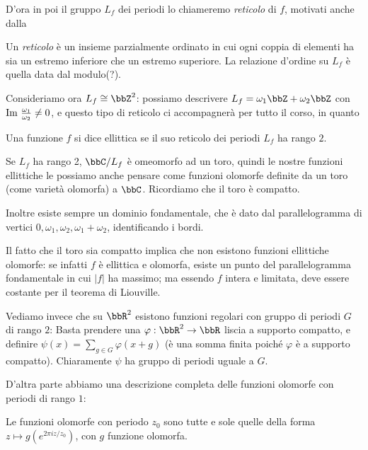 D'ora in poi il gruppo $L_f$ dei periodi lo chiameremo \emph{reticolo} di $f$, motivati anche dalla
\begin{definizione}[Reticolo]
  Un \emph{reticolo} è un insieme parzialmente ordinato in cui ogni coppia di elementi ha sia un estremo inferiore che un estremo superiore. La relazione d'ordine su $L_f$ è quella data dal modulo(?).
\end{definizione}

Consideriamo ora $L_f \cong \bbZ^2$: possiamo descrivere $L_f = \omega_1 \bbZ + \omega_2 \bbZ$ con $\text{Im } \frac{\omega_1}{\omega_2} \neq 0$, e questo tipo di reticolo ci accompagnerà per tutto il corso, in quanto

\begin{definizione}
  Una funzione $f$ si dice ellittica se il suo reticolo dei periodi $L_f$ ha rango $2$.
\end{definizione}

\begin{osservazione}
  Se $L_f$ ha rango 2, $\bbC / L_f$ è omeomorfo ad un toro, quindi le nostre funzioni ellittiche le possiamo anche pensare come funzioni olomorfe definite da un toro (come varietà olomorfa) a $\bbC$. Ricordiamo che il toro è compatto.

  Inoltre esiste sempre un dominio fondamentale, che è dato dal parallelogramma di vertici $0,\omega_1,\omega_2,\omega_1+\omega_2$, identificando i bordi.
\end{osservazione}

Il fatto che il toro sia compatto implica che non esistono funzioni ellittiche olomorfe: se infatti $f$ è ellittica e olomorfa, esiste un punto del parallelogramma fondamentale in cui $|f|$ ha massimo; ma essendo $f$ intera e limitata, deve essere costante per il teorema di Liouville.

Vediamo invece che su $\bbR^2$ esistono funzioni regolari con gruppo di periodi $G$ di rango $2$:
Basta prendere una $\varphi:\bbR^2\to\bbR$ liscia a supporto compatto, e definire $\psi(x)=\sum_{g\in G}\varphi(x+g)$ (è una somma finita poiché $\varphi$ è a supporto compatto). Chiaramente $\psi$ ha gruppo di periodi uguale a $G$.

D'altra parte abbiamo una descrizione completa delle funzioni olomorfe con periodi di rango $1$:
\begin{esercizio}
  Le funzioni olomorfe con periodo $z_0$ sono tutte e sole quelle della
  forma $z \mapsto g(e^{2\pi i z/z_0})$, con $g$ funzione olomorfa.
\end{esercizio}

